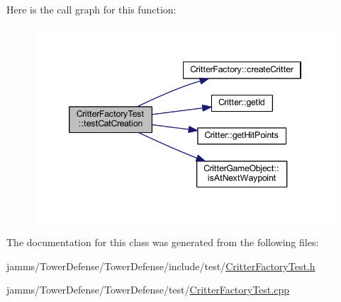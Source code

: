 Here is the call graph for this function\+:
\nopagebreak
\begin{figure}[H]
\begin{center}
\leavevmode
\includegraphics[width=346pt]{class_critter_factory_test_a65f7b71bed5e2a81441a6d2d020c31c1_cgraph}
\end{center}
\end{figure}




The documentation for this class was generated from the following files\+:\begin{DoxyCompactItemize}
\item 
jamms/\+Tower\+Defense/\+Tower\+Defense/include/test/\hyperlink{_critter_factory_test_8h}{Critter\+Factory\+Test.\+h}\item 
jamms/\+Tower\+Defense/\+Tower\+Defense/test/\hyperlink{_critter_factory_test_8cpp}{Critter\+Factory\+Test.\+cpp}\end{DoxyCompactItemize}
